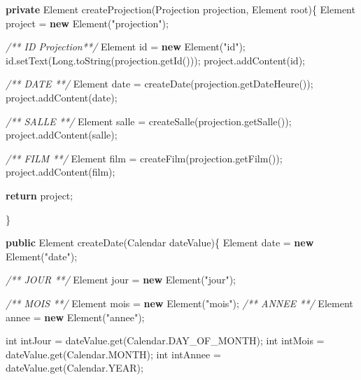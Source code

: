 \documentclass[]{article}
\newenvironment{Shaded}{}{}
\newcommand{\KeywordTok}[1]{\textcolor[rgb]{0.00,0.44,0.13}{\textbf{{#1}}}}
\newcommand{\DataTypeTok}[1]{\textcolor[rgb]{0.56,0.13,0.00}{{#1}}}
\newcommand{\StringTok}[1]{\textcolor[rgb]{0.25,0.44,0.63}{{#1}}}
\newcommand{\CommentTok}[1]{\textcolor[rgb]{0.38,0.63,0.69}{\textit{{#1}}}}
\newcommand{\FunctionTok}[1]{\textcolor[rgb]{0.02,0.16,0.49}{{#1}}}
\newcommand{\BuiltInTok}[1]{{#1}}
\newcommand{\NormalTok}[1]{{#1}}
\begin{document}
\begin{Shaded}
\begin{Highlighting}[]
	\KeywordTok{private} \BuiltInTok{Element} \FunctionTok{createProjection}\NormalTok{(Projection projection, }\BuiltInTok{Element} \NormalTok{root)\{}
		\BuiltInTok{Element} \NormalTok{project = }\KeywordTok{new} \BuiltInTok{Element}\NormalTok{(}\StringTok{"projection"}\NormalTok{);}

		\CommentTok{/** ID Projection**/}
		\BuiltInTok{Element} \NormalTok{id = }\KeywordTok{new} \BuiltInTok{Element}\NormalTok{(}\StringTok{"id"}\NormalTok{);}
		\NormalTok{id.}\FunctionTok{setText}\NormalTok{(}\BuiltInTok{Long}\NormalTok{.}\FunctionTok{toString}\NormalTok{(projection.}\FunctionTok{getId}\NormalTok{()));}
		\NormalTok{project.}\FunctionTok{addContent}\NormalTok{(id);}

		\CommentTok{/** DATE **/}
		\BuiltInTok{Element} \NormalTok{date = }\FunctionTok{createDate}\NormalTok{(projection.}\FunctionTok{getDateHeure}\NormalTok{());}
		\NormalTok{project.}\FunctionTok{addContent}\NormalTok{(date);}

		\CommentTok{/** SALLE **/}
		\BuiltInTok{Element} \NormalTok{salle = }\FunctionTok{createSalle}\NormalTok{(projection.}\FunctionTok{getSalle}\NormalTok{());}
		\NormalTok{project.}\FunctionTok{addContent}\NormalTok{(salle);}

		\CommentTok{/** FILM **/}
		\BuiltInTok{Element} \NormalTok{film = }\FunctionTok{createFilm}\NormalTok{(projection.}\FunctionTok{getFilm}\NormalTok{());}
		\NormalTok{project.}\FunctionTok{addContent}\NormalTok{(film);}

		\KeywordTok{return} \NormalTok{project;}

	\NormalTok{\}}

	\KeywordTok{public} \BuiltInTok{Element} \FunctionTok{createDate}\NormalTok{(}\BuiltInTok{Calendar} \NormalTok{dateValue)\{}
		\BuiltInTok{Element} \NormalTok{date = }\KeywordTok{new} \BuiltInTok{Element}\NormalTok{(}\StringTok{"date"}\NormalTok{);}

		\CommentTok{/** JOUR **/}
		\BuiltInTok{Element} \NormalTok{jour = }\KeywordTok{new} \BuiltInTok{Element}\NormalTok{(}\StringTok{"jour"}\NormalTok{);}

		\CommentTok{/** MOIS **/}
		\BuiltInTok{Element} \NormalTok{mois = }\KeywordTok{new} \BuiltInTok{Element}\NormalTok{(}\StringTok{"mois"}\NormalTok{);}
		\CommentTok{/** ANNEE **/}
		\BuiltInTok{Element} \NormalTok{annee = }\KeywordTok{new} \BuiltInTok{Element}\NormalTok{(}\StringTok{"annee"}\NormalTok{);}

		\DataTypeTok{int} \NormalTok{intJour = dateValue.}\FunctionTok{get}\NormalTok{(}\BuiltInTok{Calendar}\NormalTok{.}\FunctionTok{DAY_OF_MONTH}\NormalTok{);}
		\DataTypeTok{int} \NormalTok{intMois = dateValue.}\FunctionTok{get}\NormalTok{(}\BuiltInTok{Calendar}\NormalTok{.}\FunctionTok{MONTH}\NormalTok{);}
		\DataTypeTok{int} \NormalTok{intAnnee = dateValue.}\FunctionTok{get}\NormalTok{(}\BuiltInTok{Calendar}\NormalTok{.}\FunctionTok{YEAR}\NormalTok{);}


\end{Highlighting}
\end{Shaded}
\end{document}
